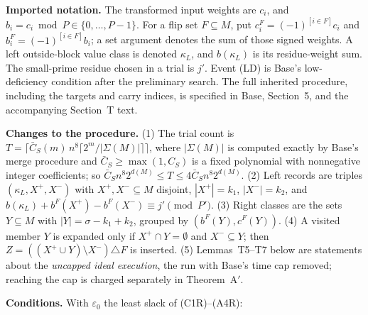 \documentclass[11pt]{article}
\newcommand{\eps}{\varepsilon}
\theoremstyle{plain}
\begin{document}
\textbf{Imported notation.} The transformed input weights are $c_i$, and $b_i=c_i\bmod P\in\{0,\ldots,P-1\}$. For a flip set $F\subseteq M$, put $c_i^F=(-1)^{[i\in F]}c_i$ and $b_i^F=(-1)^{[i\in F]}b_i$; a set argument denotes the sum of those signed weights. A left outside-block value class is denoted $\kappa_L$, and $b(\kappa_L)$ is its residue-weight sum. The small-prime residue chosen in a trial is $j'$. Event (LD) is Base's low-deficiency condition after the preliminary search. The full inherited procedure, including the targets and carry indices, is specified in Base, Section~5, and the accompanying Section~T text.

\textbf{Changes to the procedure.} (1) The trial count is $T = \lceil \bar C_S(m)\, n^8 \lceil 2^m/|\Sigma(M)| \rceil \rceil$, where $|\Sigma(M)|$ is computed exactly by Base's merge procedure and $\bar C_S \ge \max(1, C_S)$ is a fixed polynomial with nonnegative integer coefficients; so $\bar C_S n^8 2^{d(M)} \le T \le 4\bar C_S n^8 2^{d(M)}$. (2) Left records are triples $(\kappa_L, X^+, X^-)$ with $X^+, X^- \subseteq M$ disjoint, $|X^+| = k_1$, $|X^-| = k_2$, and $b(\kappa_L) + b^F(X^+) - b^F(X^-) \equiv j' \pmod{P'}$. (3) Right classes are the sets $Y \subseteq M$ with $|Y| = \sigma - k_1 + k_2$, grouped by $(b^F(Y), c^F(Y))$. (4) A visited member $Y$ is expanded only if $X^+ \cap Y = \emptyset$ and $X^- \subseteq Y$; then $Z = ((X^+ \cup Y)\setminus X^-) \triangle F$ is inserted. (5) Lemmas~T5--T7 below are statements about the \emph{uncapped ideal execution}, the run with Base's time cap removed; reaching the cap is charged separately in Theorem~A$'$.

\textbf{Conditions.} With $\eps_0$ the least slack of (C1R)--(A4R):
\end{document}
